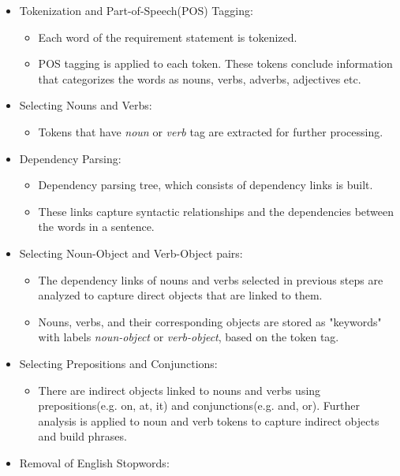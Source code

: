 \documentclass[conference]{IEEEtran}
\begin{document}
\begin{itemize}
    \item Tokenization and Part-of-Speech(POS) Tagging:
        \begin{itemize}
            \item Each word of the requirement statement is tokenized.
            \item POS tagging is applied to each token. These tokens conclude information that categorizes the words as nouns, verbs, adverbs, adjectives etc.
        \end{itemize}
    \item Selecting Nouns and Verbs:
        \begin{itemize}
            \item Tokens that have \textit{noun} or \textit{verb} tag are extracted for further processing.
        \end{itemize}
    \item Dependency Parsing:
        \begin{itemize}
            \item Dependency parsing tree, which consists of dependency links is built.
            \item These links capture syntactic relationships and the dependencies between the words in a sentence.
        \end{itemize}
    \item Selecting Noun-Object and Verb-Object pairs:
        \begin{itemize}
            \item The dependency links of nouns and verbs selected in previous steps are analyzed to capture direct objects that are linked to them. 
            \item Nouns, verbs, and their corresponding objects are stored as "keywords" with labels \textit{noun-object} or \textit{verb-object}, based on the token tag. 
        \end{itemize}
    \item Selecting Prepositions and Conjunctions:
        \begin{itemize}
            \item There are indirect objects linked to nouns and verbs using prepositions(e.g. on, at, it) and conjunctions(e.g. and, or). Further analysis is applied to noun and verb tokens to capture indirect objects and build phrases.
        \end{itemize}
    \item Removal of English Stopwords:

\end{itemize}
\end{document}
